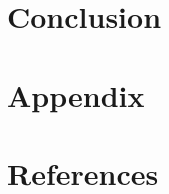 \documentclass[12pt, a4paper]{article}
\begin{document}
\clearpage

\section{Conclusion}

\section{Appendix}

\section{References}
\end{document}

